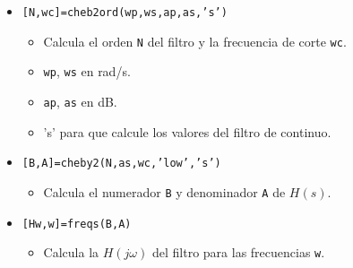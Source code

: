 \begin{frame}
\begin{itemize}
{  \begin{itemize}
    \item \alert{\texttt{[N,wc]=cheb2ord(wp,ws,ap,as,'s')}}
    \begin{itemize}
      \color{gray}
      \item Calcula el orden \texttt{N} del filtro y la frecuencia de corte \texttt{wc}.
      \item \texttt{wp}, \texttt{ws} en rad/s.
      \item \texttt{ap}, \texttt{as} en dB.
      \item 's' para que calcule los valores del filtro de continuo.
    \end{itemize}
      \item \alert{\texttt{[B,A]=cheby2(N,as,wc,'low','s')}}
    \begin{itemize}
      \color{gray}
      \item Calcula el numerador \texttt{B} y denominador \texttt{A} de $H(s)$.
    \end{itemize}
    \item \alert{\texttt{[Hw,w]=freqs(B,A)}}
    \begin{itemize}
      \color{gray}
      \item Calcula la $H(j\omega)$ del filtro para las frecuencias \texttt{w}.
    \end{itemize}  
  \end{itemize}
  }
  \end{itemize}
  
\end{frame}
  
  
  

